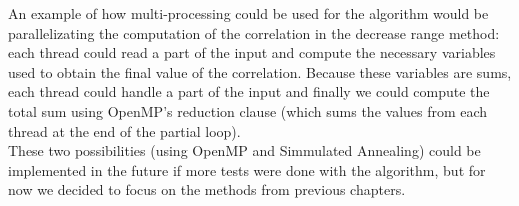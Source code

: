 An example of how multi-processing could be used for the algorithm would be parallelizating the computation of the correlation in the decrease range method: each thread could read a part of the input and compute the necessary variables used to obtain the final value of the correlation. Because these variables are sums, each thread could handle a part of the input and finally we could compute the total sum using OpenMP's reduction clause (which sums the values from each thread at the end of the partial loop). \\

These two possibilities (using OpenMP and Simmulated Annealing) could be implemented in the future if more tests were done with the algorithm, but for now we decided to focus on the methods from previous chapters.